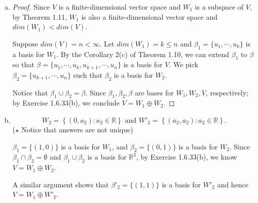 \begin{Exercise}
\begin{enumerate}[(a)]
\item
\begin{proof}
Since $V$ is a finite-dimensional vector space and $W_1$ is a subspace of $V$, by Theorem 1.11, $W_1$ is also a finite-dimensional vector space and $dim(W_1) < dim(V)$.

Suppose $dim(V) = n < \infty$. Let $dim(W_1) = k \leq n$ and $\beta_1 = \{u_1, \cdots, u_k\}$ is a basis for $W_1$. By the Corollary 2(c) of Theorem 1.10, we can extend $\beta_1$ to $\beta$ so that $\beta = \{u_1,\cdots,u_k,u_{k+1},\cdots,u_n\}$ is a basis for $V$. We pick $\beta_2 = \{u_{k+1},\cdots,u_n\}$ such that $\beta_2$ is a basis for $W_2$.

Notice that $\beta_1\cup\beta_2 = \beta$. Since $\beta_1,\beta_2,\beta$ are bases for $W_1,W_2,V$, respectively; by Exercise 1.6.33(b), we conclude $V=W_1\oplus W_2$.
\end{proof}

\item
\begin{answer}
$$
W_2 = \left\{ (0,a_2):a_2\in\mathbb{R} \right\}\text{ and }
W'_2 = \left\{ (a_2,a_2):a_2\in\mathbb{R} \right\}.
$$
($\star$ Notice that answers are not unique)
\end{answer}
\begin{solution}
$\beta_1 = \{(1,0)\}$ is a basis for $W_1$, and $\beta_2 = \{(0,1)\}$ is a basis for $W_2$. Since $\beta_1\cap\beta_2 =\emptyset$ and $\beta_1\cup\beta_2$ is a basis for $\mathbb{R}^2$, by Exercise 1.6.33(b), we know $V=W_1\oplus W_2$. 

A similar argument shows that $\beta'_2 = \{(1,1)\}$ is a basis for $W'_2$ and hence $V=W_1\oplus W'_2$.
\end{solution}
\end{enumerate}
\end{Exercise}